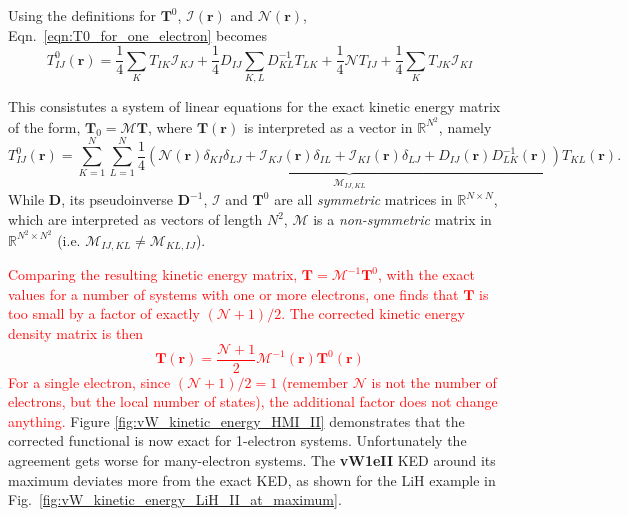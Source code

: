 \documentclass[journal=jacsat,manuscript=article]{achemso}
\newcommand\m[1]{\mathbf{#1}}
\renewcommand\vec[1]{\mathbf{#1}}
\begin{document}
Using the definitions for $\m{T}^{0}$, $\mathcal{I}(\vec{r})$ and $\mathcal{N(\vec{r})}$, Eqn.~\ref{eqn:T0_for_one_electron} becomes
\begin{equation}
T^0_{IJ}(\vec{r}) = \frac{1}{4} \sum_K T_{IK} \mathcal{I}_{KJ} + \frac{1}{4} D_{IJ} \sum_{K,L} D^{-1}_{KL} T_{LK} + \frac{1}{4} \mathcal{N} T_{IJ} + \frac{1}{4} \sum_K T_{JK} \mathcal{I}_{KI} \label{eqn:T0_lhs}
\end{equation}

This consistutes a system of linear equations for the exact kinetic energy matrix of the form, $\m{T}_0 = \mathcal{M} \m{T}$, where $\m{T}(\vec{r})$ is interpreted as a vector in $\mathbb{R}^{N^2}$, namely
\begin{equation}
  T_{IJ}^0(\vec{r}) = \sum_{K=1}^N \sum_{L=1}^N \underbrace{\frac{1}{4} \left(
  \mathcal{N}(\vec{r}) \delta_{KI} \delta_{LJ} +
  \mathcal{I}_{KJ}(\vec{r}) \delta_{IL} +
  \mathcal{I}_{KI}(\vec{r}) \delta_{LJ} +
  D_{IJ}(\vec{r}) D^{-1}_{LK}(\vec{r}) \right)}_{\mathcal{M}_{IJ,KL}} T_{KL}(\vec{r}).
\end{equation}
While $\m{D}$, its pseudoinverse $\m{D}^{-1}$, $\mathcal{I}$ and $\m{T}^{0}$ are all \emph{symmetric} matrices in $\mathbb{R}^{N \times N}$, which are interpreted as vectors of length $N^2$,
$\mathcal{M}$ is a \emph{non-symmetric} matrix in $\mathbb{R}^{N^2 \times N^2}$ (i.e. $\mathcal{M}_{IJ,KL} \neq \mathcal{M}_{KL,IJ}$).

\textcolor{red}{
Comparing the resulting kinetic energy matrix, $\m{T} = \mathcal{M}^{-1} \m{T}^0$, with the exact values for a number of systems with one or more electrons, one finds that ${\m{T}}$ is too small by a factor of exactly $(\mathcal{N}+1)/2$.  The corrected kinetic energy  density matrix is then
\begin{equation}
 \m{T}(\vec{r}) = \frac{\mathcal{N}+1}{2} \mathcal{M}^{-1}(\vec{r}) \m{T}^0(\vec{r}) \label{eqn:von_Weizasecker_many_electrons_corrected}
\end{equation}
For a single electron, since $(\mathcal{N}+1)/2 = 1$ (remember $\mathcal{N}$ is not the number of electrons, but the local number of states), the additional factor does not change anything.
}
Figure \ref{fig:vW_kinetic_energy_HMI_II} demonstrates that the corrected functional is now exact for 1-electron systems.
Unfortunately the agreement gets worse for many-electron systems. The \textbf{vW1eII} KED around its maximum deviates more from the exact KED, as shown for the LiH example in Fig.~\ref{fig:vW_kinetic_energy_LiH_II_at_maximum}.
\end{document}
